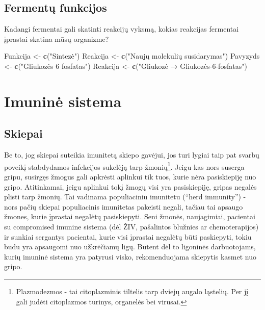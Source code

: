 \documentclass[]{book}
\newenvironment{Shaded}{\begin{snugshade}}{\end{snugshade}}
\newcommand{\KeywordTok}[1]{\textcolor[rgb]{0.13,0.29,0.53}{\textbf{#1}}}
\newcommand{\NormalTok}[1]{#1}
\newcommand{\StringTok}[1]{\textcolor[rgb]{0.31,0.60,0.02}{#1}}
\let\rmarkdownfootnote\footnote%
\def\footnote{\protect\rmarkdownfootnote}
\begin{document}
\hypertarget{fermentu-funkcijos}{%
\section{Fermentų funkcijos}\label{fermentu-funkcijos}}

Kadangi fermentai gali skatinti reakcijų vyksmą, kokias reakcijas fermentai įprastai skatina mūsų organizme?

\begin{Shaded}
\begin{Highlighting}[]
\NormalTok{Funkcija <-}\StringTok{ }\KeywordTok{c}\NormalTok{(}\StringTok{"Sintezė"}\NormalTok{)}
\NormalTok{Reakcija <-}\StringTok{ }\KeywordTok{c}\NormalTok{(}\StringTok{"Naujų molekulių susidarymas"}\NormalTok{)}
\NormalTok{Pavyzyds <-}\StringTok{ }\KeywordTok{c}\NormalTok{(}\StringTok{"Gliukozės 6 fosfatas"}\NormalTok{)}
\NormalTok{Reakcija <-}\StringTok{ }\KeywordTok{c}\NormalTok{(}\StringTok{"Gliukozė → Gliukozės-6-fosfatas"}\NormalTok{)}
\end{Highlighting}
\end{Shaded}

\hypertarget{imunine-sistema}{%
\chapter{Imuninė sistema}\label{imunine-sistema}}

\hypertarget{skiepai}{%
\section{Skiepai}\label{skiepai}}

Be to, jog skiepai suteikia imunitetą skiepo gavėjui, jos turi lygiai taip pat svarbų poveikį stabdydamos infekcijos sukelėją tarp žmonių\footnote{Plazmodezmos - tai citoplazminis tiltelis tarp dviejų augalo ląstelių. Per jį gali judėti citoplazmos turinys, organelės bei virusai.}. Jeigu kas nors suserga gripu, susirgęs žmogus gali apkrėsti aplinkui tik tuos, kurie nėra pasiskiepiję nuo gripo. Atitinkamai, jeigu aplinkui tokį žmogų visi yra pasiskiepiję, gripas negalės plisti tarp žmonių. Tai vadinama populiaciniu imunitetu (``herd immunity'') - nors pačių skiepai populiacinis imunitetas pakeisti negali, tačiau tai apsaugo žmones, kurie įprastai negalėtų pasiskiepyti. Seni žmonės, naujagimiai, pacientai su compromised imunine sistema (dėl ŽIV, pašalintos blužnies ar chemoterapijos) ir sunkiai sergantys pacientai, kurie visi įprastai negalėtų būti paskiepyti, tokiu būdu yra apsaugomi nuo užkrėčiamų ligų. Būtent dėl to ligoninės darbuotojams, kurių imuninė sistema yra patyrusi visko, rekomenduojama skiepytis kasmet nuo gripo.
\end{document}
